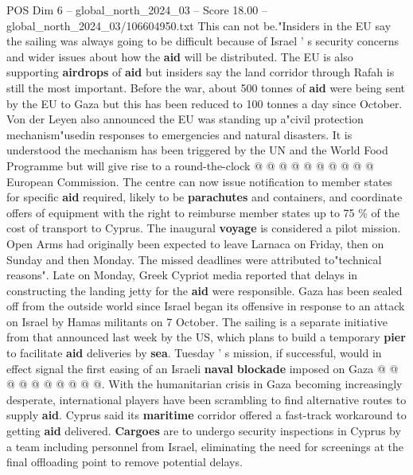 \begin{textsample}{POS Dim 6 – global\_north\_2024\_03 – Score 18.00 – global\_north\_2024\_03/106604950.txt}
This can not be."Insiders in the EU say the sailing was always going to be difficult because of Israel ' s security concerns and wider issues about how the \textbf{aid} will be distributed.
The EU is also supporting \textbf{airdrops} of \textbf{aid} but insiders say the land corridor through Rafah is still the most important.
Before the war, about 500 tonnes of \textbf{aid} were being sent by the EU to Gaza but this has been reduced to 100 tonnes a day since October.
Von der Leyen also announced the EU was standing up a"civil protection mechanism"usedin responses to emergencies and natural disasters.
It is understood the mechanism has been triggered by the UN and the World Food Programme but will give rise to a round-the-clock @ @ @ @ @ @ @ @ @ @ European Commission.
The centre can now issue notification to member states for specific \textbf{aid} required, likely to be \textbf{parachutes} and containers, and coordinate offers of equipment with the right to reimburse member states up to 75 \% of the cost of transport to Cyprus.
The inaugural \textbf{voyage} is considered a pilot mission.
Open Arms had originally been expected to leave Larnaca on Friday, then on Sunday and then Monday.
The missed deadlines were attributed to"technical reasons".
Late on Monday, Greek Cypriot media reported that delays in constructing the landing jetty for the \textbf{aid} were responsible.
Gaza has been sealed off from the outside world since Israel began its offensive in response to an attack on Israel by Hamas militants on 7 October.
The sailing is a separate initiative from that announced last week by the US, which plans to build a temporary \textbf{pier} to facilitate \textbf{aid} deliveries by \textbf{sea}.
Tuesday ' s mission, if successful, would in effect signal the first easing of an Israeli \textbf{naval} \textbf{blockade} imposed on Gaza @ @ @ @ @ @ @ @ @ @.
With the humanitarian crisis in Gaza becoming increasingly desperate, international players have been scrambling to find alternative routes to supply \textbf{aid}.
Cyprus said its \textbf{maritime} corridor offered a fast-track workaround to getting \textbf{aid} delivered. \textbf{Cargoes} are to undergo security inspections in Cyprus by a team including personnel from Israel, eliminating the need for screenings at the final offloading point to remove potential delays.

\end{textsample}
